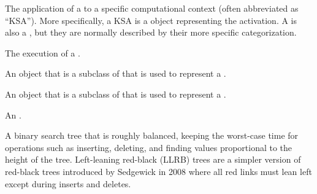 \begin{glossary-list}

\glent[KS~activation]
%
%
%
%
%
%
%
%
%
The application of a  to a specific computational context
(often abbreviated as ``KSA'').  More specifically, a KSA is a
 object representing the  activation.  A
 is also a , but they are normally
described by their more specific categorization.


\glent[KS~execution]
%
%
%
%
%
The execution of a .


\glent[ks~class]
%
%
%
%
%
An object that is a subclass of
 that is used to represent a
.


%
%
%
%
%
An object that is a subclass of
 that is used to represent a
.


%
%
An .


%
%
%
A binary search tree that is roughly balanced, keeping the worst-case time for
operations such as inserting, deleting, and finding values proportional to the
height of the tree. Left-leaning red-black (LLRB) trees are a simpler version
of red-black trees introduced by Sedgewick in 2008 where all red links must
lean left except during inserts and deletes.


\end{glossary-list}
